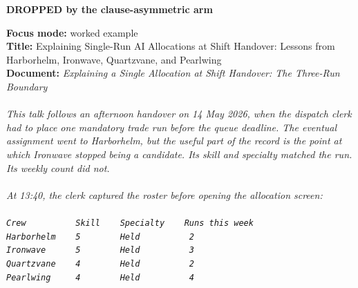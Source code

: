 \documentclass[9pt]{article}
\begin{document}
\begin{minipage}[t]{\textwidth}
\begin{minipage}[t]{0.49\textwidth}
\begin{exbox}
\end{exbox}
\end{minipage}\hfill
\begin{minipage}[t]{0.49\textwidth}\fontsize{7.49}{8.24}\linespread{1}\selectfont
\textbf{DROPPED by the clause-asymmetric arm}\\[1pt]
\begin{exbox}
  \textbf{Focus mode:} worked example\\
  \textbf{Title:} Explaining Single-Run AI Allocations at Shift Handover: Lessons from Harborhelm, Ironwave, Quartzvane, and Pearlwing\\[3pt]
  \textbf{Document:} \textit{Explaining a Single Allocation at Shift Handover: The Three-Run Boundary \\
  \  \\
  This talk follows an afternoon handover on 14 May 2026, when the dispatch clerk had to place one mandatory trade run before the queue deadline. The eventual assignment went to Harborhelm, but the useful part of the record is the point at which Ironwave stopped being a candidate. Its skill and specialty matched the run. Its weekly count did not. \\
  \  \\
  At 13:40, the clerk captured the roster before opening the allocation screen: \\
  \  \\
  \textup{\texttt{Crew~~~~~~~~~~Skill~~~~Specialty~~~~Runs this week}} \\
  \textup{\texttt{Harborhelm~~~~5~~~~~~~~Held~~~~~~~~~~2}} \\
  \textup{\texttt{Ironwave~~~~~~5~~~~~~~~Held~~~~~~~~~~3}} \\
  \textup{\texttt{Quartzvane~~~~4~~~~~~~~Held~~~~~~~~~~2}} \\
  \textup{\texttt{Pearlwing~~~~~4~~~~~~~~Held~~~~~~~~~~4}} \\
}
\end{exbox}
\end{minipage}
\end{minipage}
\end{document}
